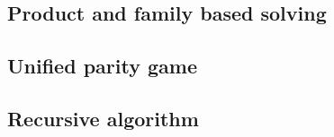 \subsection{Product and family based solving}


\subsection{Unified parity game}
\label{sec_unified_pg}


\subsection{Recursive algorithm}
